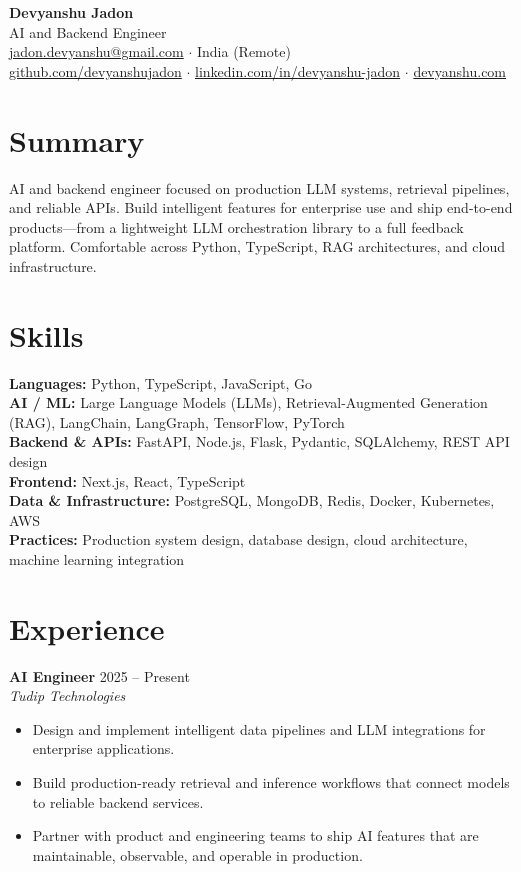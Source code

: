 \documentclass[10.5pt,a4paper]{article}
\newcommand{\roleline}[3]{%
  \textbf{#1} \hfill #3\\[-0.5pt]
  \textit{#2}\\[2pt]
}
\begin{document}
\begin{center}
  {\LARGE\bfseries Devyanshu Jadon}\\[3pt]
  AI and Backend Engineer\\[3pt]
  \href{mailto:jadon.devyanshu@gmail.com}{jadon.devyanshu@gmail.com}
  $\cdot$ India (Remote)\\[2pt]
  \href{https://github.com/devyanshujadon}{github.com/devyanshujadon}
  $\cdot$
  \href{https://linkedin.com/in/devyanshu-jadon}{linkedin.com/in/devyanshu-jadon}
  $\cdot$
  \href{https://devyanshu.com}{devyanshu.com}
\end{center}

\section{Summary}
AI and backend engineer focused on production LLM systems, retrieval pipelines, and reliable APIs. Build intelligent features for enterprise use and ship end-to-end products---from a lightweight LLM orchestration library to a full feedback platform. Comfortable across Python, TypeScript, RAG architectures, and cloud infrastructure.

\section{Skills}
\textbf{Languages:} Python, TypeScript, JavaScript, Go\\[2pt]
\textbf{AI / ML:} Large Language Models (LLMs), Retrieval-Augmented Generation (RAG), LangChain, LangGraph, TensorFlow, PyTorch\\[2pt]
\textbf{Backend \& APIs:} FastAPI, Node.js, Flask, Pydantic, SQLAlchemy, REST API design\\[2pt]
\textbf{Frontend:} Next.js, React, TypeScript\\[2pt]
\textbf{Data \& Infrastructure:} PostgreSQL, MongoDB, Redis, Docker, Kubernetes, AWS\\[2pt]
\textbf{Practices:} Production system design, database design, cloud architecture, machine learning integration

\section{Experience}

\roleline{AI Engineer}{Tudip Technologies}{2025 -- Present}
\begin{itemize}
  \item Design and implement intelligent data pipelines and LLM integrations for enterprise applications.
  \item Build production-ready retrieval and inference workflows that connect models to reliable backend services.
  \item Partner with product and engineering teams to ship AI features that are maintainable, observable, and operable in production.
\end{itemize}
\end{document}
